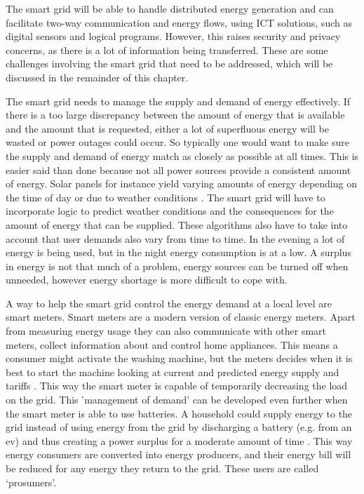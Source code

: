 The smart grid will be able to handle distributed energy generation and can facilitate two-way communication and energy flows, using ICT solutions, such as digital sensors and logical programs. However, this raises security and privacy concerns, as there is a lot of information being transferred. These are some challenges involving the smart grid that need to be addressed, which will be discussed in the remainder of this chapter.

The smart grid needs to manage the supply and demand of energy effectively. If there is a too large discrepancy between the amount of energy that is available and the amount that is requested, either a lot of superfluous energy will be wasted or power outages could occur. So typically one would want to make sure the supply and demand of energy match as closely as possible at all times. This is easier said than done because not all power sources provide a consistent amount of energy. Solar panels for instance yield varying amounts of energy depending on the time of day or due to weather conditions \cite{RamchurnVitelingumRogersJennings2014}. The smart grid will have to incorporate logic to predict weather conditions and the consequences for the amount of energy that can be supplied. These algorithms also have to take into account that user demands also vary from time to time. In the evening a lot of energy is being used, but in the night energy consumption is at a low. A surplus in energy is not that much of a problem, energy sources can be turned off when unneeded, however energy shortage is more difficult to cope with.

A way to help the smart grid control the energy demand at a local level  are smart meters. Smart meters are a modern version of classic energy meters. Apart from measuring energy usage they can also communicate with other smart meters, collect information about and control home appliances. This means a consumer might activate the washing machine, but the meters decides when it is best to start the machine looking at current and predicted energy supply and tariffs  \cite{DepuruWangDevabhaktuni2011a}. This way the smart meter is capable of temporarily decreasing the load on the grid. This 'management of demand' can be developed even further when the smart meter is able to use batteries. A household could supply energy to the grid instead of using energy from the grid by discharging a battery (e.g. from an \ac{ev}) and thus creating a power surplus for a moderate amount of time \cite{MwasiluJustoKimEtAl2014}. This way energy consumers are converted into energy producers, and their energy bill will be reduced for any energy they return to the grid. These users are called `prosumers'.

